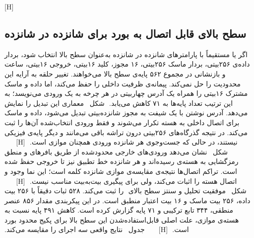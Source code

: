 ‫
‫[H]
‫
‫
‫
‫
‫
‫\subsection{سطح بالای قابل اتصال به بورد برای شانزده در شانزده}
‫
‫اگر  یا  مستقیماً با پارامترهای شانزده در شانزده به‌عنوان
‫سطح بالا انتخاب شود، بردار داده‌ی ۲۵۶‌بیتی، بردار ماسک ۲۵۶‌بیتی، ۱۶ مجوز، کلید ۱۶‌بیتی،
‫خروجی ۱۶‌بیتی، ساعت و بازنشانی در مجموع ۵۶۲ پایه‌ی سطح بالا می‌خواهند. تغییر حلقه به آرایه
‫این محدودیت را حل نمی‌کند. پیمانه‌ی  ظرفیت داخلی را حفظ می‌کند،
‫اما داده و ماسک مشترک ۱۶‌بیتی را همراه یک آدرس چهار‌بیتی در هر چرخه به یک ورودی می‌نویسد؛
‫به این ترتیب تعداد پایه‌ها به ۷۱ کاهش می‌یابد.
‫
‫شکل~ معماری این تبدیل را نمایش می‌دهد. آدرس نوشتن با
‫یک شیفت به مجوز  شانزده‌بیتی تبدیل می‌شود، داده و ماسک برای اتصال داخلی
‫به هسته تکرار می‌شوند و فقط ورودی انتخاب‌شده آن‌ها را ثبت می‌کند. در نتیجه گذرگاه‌های
‫۲۵۶‌بیتی درون تراشه باقی می‌مانند و دیگر پایه‌ی فیزیکی نیستند، در حالی که جست‌وجوی هر
‫شانزده ورودی همچنان موازی است.
‫
‫[H]
‫
‫
‫
‫
‫
‫شکل~ نشان می‌دهد ورودی‌های خارجی محدودشده از طریق
‫بافرهای  و منطق رمزگشایی به هسته‌ی  رسیده‌اند و هر شانزده خط تطبیق
‫نیز تا خروجی حفظ شده است. تراکم اتصال‌ها نتیجه‌ی مقایسه‌ی موازی شانزده کلمه است؛ این نما
‫وجود و اتصال هسته را اثبات می‌کند، ولی برای پیگیری بیت‌به‌بیت مناسب نیست.
‫
‫[H]
‫
‫
‫
‫
‫
‫شکل~ موفقیت تحلیل و سنتز سطح بالای
‫ را ثبت می‌کند. ۵۲۸ ثبات دقیقاً با ۲۵۶ بیت داده، ۲۵۶ بیت ماسک
‫و ۱۶ بیت اعتبار منطبق است. در این پیکربندی  مقدار ۸۵۶ عنصر منطقی، ۳۴۴
‫تابع ترکیبی و ۷۱ پایه گزارش کرده است. کاهش ۴۹۱ پایه نسبت به هسته‌ی موازی، علت اصلی
‫قابل‌استفاده‌شدن این سطح بالا برای پکیج محدود بورد است.
‫
‫[H]
‫
‫
‫
‫
‫
‫جدول~ نتایج واقعی سه اجرای  را مقایسه می‌کند.
